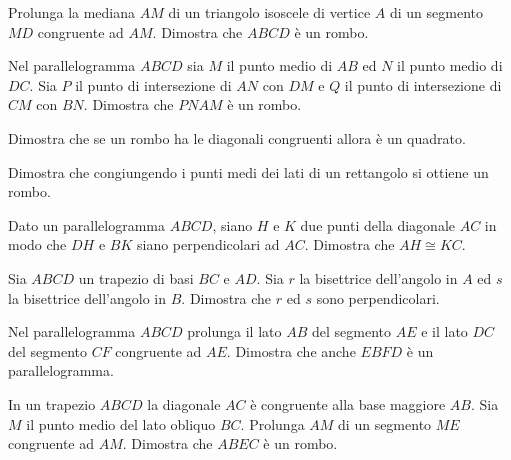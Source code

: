 \begin{multicols}{2}
\begin{esercizio}
\label{ese:4.20}
Prolunga la mediana $AM$ di un triangolo isoscele di vertice $A$ di un segmento $MD$ congruente ad $AM$. Dimostra che $ABCD$ è un rombo.
\end{esercizio}

\begin{esercizio}
\label{ese:4.21}
Nel parallelogramma $ABCD$ sia $M$ il punto medio di $AB$ ed $N$ il punto medio di $DC$. Sia $P$ il punto di intersezione di $AN$ con $DM$ e $Q$ il punto di intersezione di $CM$ con $BN$. Dimostra che $PNAM$ è un rombo.
\end{esercizio}

\begin{esercizio}
\label{ese:4.22}
Dimostra che se un rombo ha le diagonali congruenti allora è un quadrato.
\end{esercizio}

\begin{esercizio}
\label{ese:4.23}
Dimostra che congiungendo i punti medi dei lati di un rettangolo si ottiene un rombo.
\end{esercizio}

\begin{esercizio}
\label{ese:4.24}
Dato un parallelogramma $ABCD$, siano $H$ e $K$ due punti della diagonale $AC$ in modo che $DH$ e $BK$ siano perpendicolari ad $AC$. Dimostra che $AH\cong KC$.
\end{esercizio}

\begin{esercizio}
\label{ese:4.25}
Sia $ABCD$ un trapezio di basi $BC$ e $AD$. Sia $r$ la bisettrice dell'angolo in $A$ ed $s$ la bisettrice dell'angolo in $B$. Dimostra che $r$ ed $s$ sono perpendicolari.
\end{esercizio}

\begin{esercizio}
\label{ese:4.26}
Nel parallelogramma $ABCD$ prolunga il lato $AB$ del segmento $AE$ e il lato $DC$ del segmento $CF$ congruente ad $AE$. Dimostra che anche $EBFD$ è un parallelogramma.
\end{esercizio}

\begin{esercizio}
\label{ese:4.27}
In un trapezio $ABCD$ la diagonale $AC$ è congruente alla base maggiore $AB$. Sia $M$ il punto medio del lato obliquo $BC$. Prolunga $AM$ di un segmento $ME$ congruente ad $AM$. Dimostra che $ABEC$ è un rombo.
\end{esercizio}


\end{multicols}
